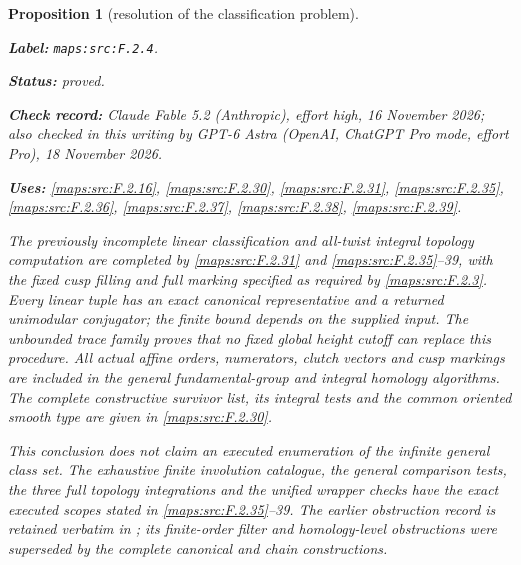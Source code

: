 \documentclass[11pt,a4paper]{article}
\newtheorem{proposition}[proposition]{Proposition}
\theoremstyle{definition}
\newcommand{\StatementRecord}[4]{\par\smallskip\begingroup\upshape\raggedright\noindent\textbf{Label:} \nolinkurl{#1}.\par\noindent\textbf{Status:} #2.\par\noindent\textbf{Check record:} #3.\par\noindent\textbf{Uses:} #4.\par\endgroup\smallskip}
\newcommand{\CurrentChecker}{GPT-6 Astra (OpenAI, ChatGPT Pro mode, effort Pro), 18 November 2026}
\begin{document}
\begin{proposition}[resolution of the classification problem]\label{maps:src:F.2.4}
\StatementRecord{maps:src:F.2.4}{proved}{Claude Fable 5.2 (Anthropic), effort high, 16 November 2026; also checked in this writing by \CurrentChecker}{\cref{maps:src:F.2.16}, \cref{maps:src:F.2.30}, \cref{maps:src:F.2.31}, \cref{maps:src:F.2.35}, \cref{maps:src:F.2.36}, \cref{maps:src:F.2.37}, \cref{maps:src:F.2.38}, \cref{maps:src:F.2.39}}


The previously incomplete linear classification and all-twist
integral topology computation are completed by \ref{maps:src:F.2.31} and
\ref{maps:src:F.2.35}--39, with the fixed cusp filling and full marking
specified as required by \ref{maps:src:F.2.3}.  Every linear tuple has an
exact canonical representative and a returned unimodular
conjugator; the finite bound depends on the supplied input.
The unbounded trace family proves that no fixed global
height cutoff can replace this procedure.  All actual affine
orders, numerators, clutch vectors and cusp markings are
included in the general fundamental-group and integral
homology algorithms.  The complete constructive survivor
list, its integral tests and the common oriented smooth
type are given in \ref{maps:src:F.2.30}.

This conclusion does not claim an executed enumeration of
the infinite general class set.  The exhaustive finite
involution catalogue, the general comparison tests, the
three full topology integrations and the unified wrapper
checks have the exact executed scopes stated in \ref{maps:src:F.2.35}--39.
The earlier obstruction record is retained verbatim in
; its finite-order
filter and homology-level obstructions were superseded by
the complete canonical and chain constructions.


\end{proposition}
\end{document}
